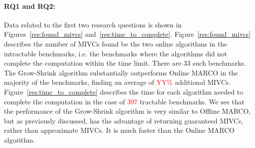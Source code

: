 \paragraph{RQ1 and RQ2:}
Data related to the first two research questions is shown in Figures~\ref{res:found_mivcs} and~\ref{res:time_to_complete}. 
Figure~\ref{res:found_mivcs} describes the number of MIVCs found be the two online algorithms in the intractable benchmarks, i.e. the benchmarks where the algorithms did not complete the computation within the time limit. There are 33 such benchmarks. 
The Grow-Shrink algorithm substantially outperforms Online MARCO in the majority of the benchmarks, finding an average of \textcolor{red}{YY\%} additional MIVCs. 
Figure~\ref{res:time_to_complete} describes the time for each algorithm needed to complete the computation in the case of \textcolor{red}{397} tractable benchmarks. We see that the performance of the Grow-Shrink algorithm is very similar to Offline MARCO, but as previously discussed, has the advantage of returning guaranteed MIVCs, rather than approximate MIVCs.  It is much faster than the Online MARCO algorithm.%


